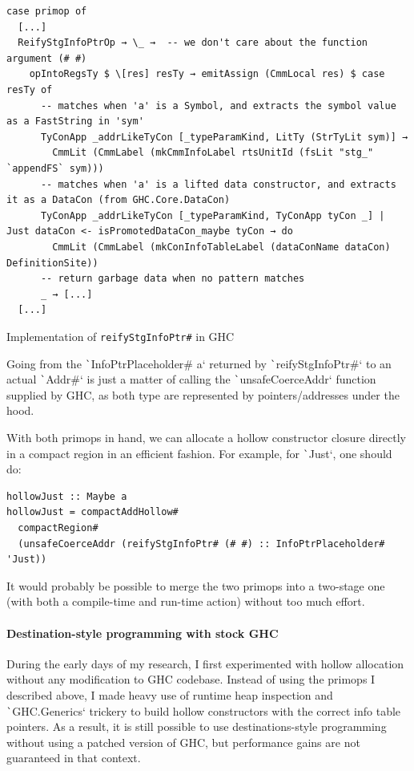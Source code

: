 \documentclass[english]{jflart}
\begin{document}
\begin{table}[H]
\small
\begin{verbatim}
case primop of
  [...]
  ReifyStgInfoPtrOp → \_ →  -- we don't care about the function argument (# #)
    opIntoRegsTy $ \[res] resTy → emitAssign (CmmLocal res) $ case resTy of
      -- matches when 'a' is a Symbol, and extracts the symbol value as a FastString in 'sym'
      TyConApp _addrLikeTyCon [_typeParamKind, LitTy (StrTyLit sym)] →
        CmmLit (CmmLabel (mkCmmInfoLabel rtsUnitId (fsLit "stg_" `appendFS` sym)))
      -- matches when 'a' is a lifted data constructor, and extracts it as a DataCon (from GHC.Core.DataCon)
      TyConApp _addrLikeTyCon [_typeParamKind, TyConApp tyCon _] | Just dataCon <- isPromotedDataCon_maybe tyCon → do
        CmmLit (CmmLabel (mkConInfoTableLabel (dataConName dataCon) DefinitionSite))
      -- return garbage data when no pattern matches
      _ → [...]
  [...]
\end{verbatim}
\caption{Implementation of \texttt{reifyStgInfoPtr\#} in GHC}
\label{table:impl-reifyStgInfoPtr}
\end{table}

Going from the \texttt`InfoPtrPlaceholder# a` returned by \texttt`reifyStgInfoPtr#` to an actual \texttt`Addr#` is just a matter of calling the \texttt`unsafeCoerceAddr` function supplied by GHC, as both type are represented by pointers/addresses under the hood.

With both primops in hand, we can allocate a hollow constructor closure directly in a compact region in an efficient fashion. For example, for \texttt`Just`, one should do:
{\small
\begin{verbatim}
hollowJust :: Maybe a
hollowJust = compactAddHollow#
  compactRegion#
  (unsafeCoerceAddr (reifyStgInfoPtr# (# #) :: InfoPtrPlaceholder# 'Just))  
\end{verbatim}
}

It would probably be possible to merge the two primops into a two-stage one (with both a compile-time and run-time action) without too much effort.

\paragraph{Destination-style programming with stock GHC}

During the early days of my research, I first experimented with hollow allocation without any modification to GHC codebase. Instead of using the primops I described above, I made heavy use of runtime heap inspection and \texttt`GHC.Generics` trickery to build hollow constructors with the correct info table pointers. As a result, it is still possible to use destinations-style programming without using a patched version of GHC, but performance gains are not guaranteed in that context.
\end{document}
